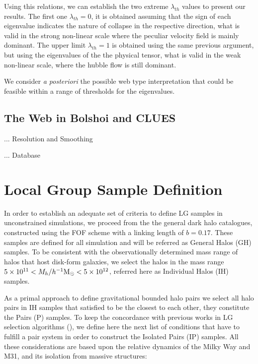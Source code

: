 \documentclass[usenatbib]{latex/mn2e}
\begin{document}
Using this relations, we can establish the two extreme $\lambda_{th}$ 
values to present our results. The first one $\lambda_{th} = 0$, it is 
obtained assuming that the sign of each eigenvalue indicates the nature of
collapse in the respective direction, what is valid in the strong 
non-linear scale where the peculiar velocity field is mainly dominant. 
The upper limit $\lambda_{th} = 1$ is obtained using the same previous 
argument, but using the eigenvalues of the the physical tensor, what is 
valid in the weak non-linear scale, where the hubble flow is still 
dominant.


We consider \textit{a posteriori} the possible web type interpretation 
that could be feasible within a range of thresholds for the eigenvalues. 


\subsection{The Web in Bolshoi and CLUES}
\label{subsec:web_in_simulations}
... Resolution and Smoothing

... Database


\section{Local Group Sample Definition}
\label{section:Def_Samples}

In order to establish an adequate set of criteria to define LG samples in 
unconstrained simulations, we proceed from the the general dark halo 
catalogues, constructed using the FOF scheme with a linking length of 
$b=0.17$. These samples are defined for all simulation and will be 
referred as General Halos (GH) samples. To be consistent with the 
observationally determined mass range of halos that host disk-form 
galaxies, we select the halos in the mass range $5\times10^{11} <
M_{h}/\hMsun < 5\times 10^{12}$, referred here as Individual Halos (IH) 
samples. 


As a primal approach to define gravitational bounded halo pairs we select 
all halo pairs in IH samples that satisfied to be the closest to each 
other, they constitute the Pairs (P) samples. To keep the concordance with
previous works in LG selection algorithms (\SRKED{[references here}), we 
define here the next list of conditions that have to fulfill a pair system 
in order to construct the Isolated Pairs (IP) samples. All these 
considerations are based upon the relative dynamics of the Milky Way and 
M31, and its isolation from massive structures:
\end{document}
